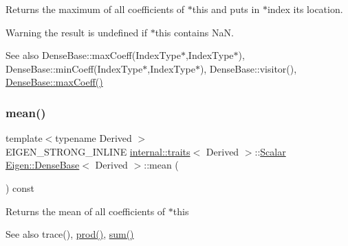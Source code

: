 \begin{DoxyReturn}{Returns}
the maximum of all coefficients of $\ast$this and puts in $\ast$index its location. 
\end{DoxyReturn}
\begin{DoxyWarning}{Warning}
the result is undefined if {\ttfamily $\ast$this} contains NaN.
\end{DoxyWarning}
\begin{DoxySeeAlso}{See also}
Dense\+Base\+::max\+Coeff(\+Index\+Type$\ast$,\+Index\+Type$\ast$), Dense\+Base\+::min\+Coeff(\+Index\+Type$\ast$,\+Index\+Type$\ast$), Dense\+Base\+::visitor(), \mbox{\hyperlink{class_eigen_1_1_dense_base_ac0d151ec47eb7a44a3a5ba1587ddbeb4}{Dense\+Base\+::max\+Coeff()}} 
\end{DoxySeeAlso}
\mbox{\label{class_eigen_1_1_dense_base_a89d85ac0cf349eb53481c148033459d7}} 
\subsubsection{\texorpdfstring{mean()}{mean()}}
{\footnotesize\ttfamily template$<$typename Derived $>$ \\
E\+I\+G\+E\+N\+\_\+\+S\+T\+R\+O\+N\+G\+\_\+\+I\+N\+L\+I\+NE \mbox{\hyperlink{struct_eigen_1_1internal_1_1traits}{internal\+::traits}}$<$ Derived $>$\+::\mbox{\hyperlink{class_eigen_1_1_dense_base_a5feed465b3a8e60c47e73ecce83e39a2}{Scalar}} \mbox{\hyperlink{class_eigen_1_1_dense_base}{Eigen\+::\+Dense\+Base}}$<$ Derived $>$\+::mean (\begin{DoxyParamCaption}{ }\end{DoxyParamCaption}) const}

\begin{DoxyReturn}{Returns}
the mean of all coefficients of $\ast$this
\end{DoxyReturn}
\begin{DoxySeeAlso}{See also}
trace(), \mbox{\hyperlink{class_eigen_1_1_dense_base_a175ceb201923b4c6767770559e47e40e}{prod()}}, \mbox{\hyperlink{class_eigen_1_1_dense_base_a4dee689c76ff86da9d8e49950604597b}{sum()}} 
\end{DoxySeeAlso}
\mbox{\label{class_eigen_1_1_dense_base_a3fc39624015c1702d22ebb322aa9ebce}} 
